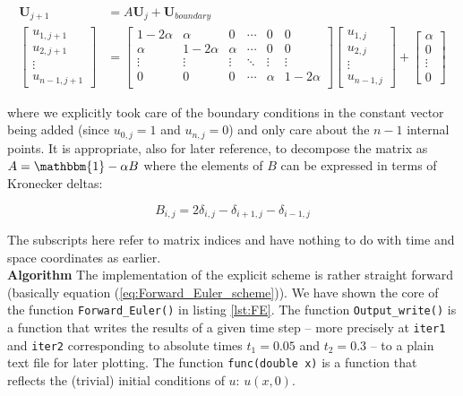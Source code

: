 \documentclass[a4paper, 11pt, notitlepage,english]{article}
\newcommand{\id}{\mathbbm{1}}
\begin{document}
\begin{align}
\boldsymbol{U}_{j+1} &= A \boldsymbol{U}_j + \boldsymbol{U}_{boundary}\\
\begin{bmatrix}
u_{1,j+1} \\ u_{2,j+1} \\ \vdots \\ u_{n-1,j+1}
\end{bmatrix}
&=
\begin{bmatrix}
 1-2\alpha & \alpha & 0 & \cdots & 0 & 0 \\
 \alpha & 1-2\alpha & \alpha & \cdots & 0 & 0 \\
 \vdots & \vdots & \vdots & \ddots & \vdots & \vdots \\
 0 & 0 & 0 & \cdots & \alpha & 1-2\alpha \\
\end{bmatrix}
\begin{bmatrix}
u_{1,j} \\ u_{2,j} \\ \vdots \\ u_{n-1,j}
\end{bmatrix}
+
\begin{bmatrix}
\alpha \\ 0 \\ \vdots \\ 0
\end{bmatrix}
\label{eq:Forward_Euler_matrix}
\end{align}

where we explicitly took care of the boundary conditions in the constant vector being added (since $u_{0,j} = 1$ and $u_{n,j} = 0$) and only care about the $n-1$ internal points. It is appropriate, also for later reference, to decompose the matrix as $A = \id - \alpha B$ where the elements of $B$ can be expressed in terms of Kronecker deltas: 

\begin{equation}
B_{i,j} = 2\delta_{i,j}-\delta_{i+1,j}-\delta_{i-1,j}
\label{eq:Matrix_B}
\end{equation}

The subscripts here refer to matrix indices and have nothing to do with time and space coordinates as earlier. \\

\textbf{Algorithm} \newline
The implementation of the explicit scheme is rather straight forward (basically equation (\ref{eq:Forward_Euler_scheme})). We have shown the core of the function \texttt{Forward\_Euler()} in listing \ref{lst:FE}. The function \texttt{Output\_write()} is a function that writes the results of a given time step – more precisely at \texttt{iter1} and \texttt{iter2} corresponding to absolute times $t_1 = 0.05$ and $t_2 = 0.3$ – to a plain text file for later plotting. The function \texttt{func(double x)} is a function that reflects the (trivial) initial conditions of $u$: $u(x,0)$.
\end{document}
